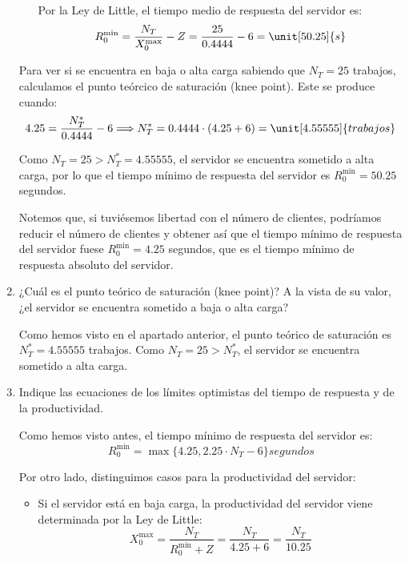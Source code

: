 \begin{ejercicio}
\begin{enumerate}
\begin{itemize}
            Por la Ley de Little, el tiempo medio de respuesta del servidor es:
            \begin{equation*}
                R_0^{\text{min}} = \dfrac{N_T}{X_0^{\text{max}}} - Z = \dfrac{25}{0.4444} - 6 = \unit[50.25]{s}
            \end{equation*}
        \end{itemize}

        Para ver si se encuentra en baja o alta carga sabiendo que $N_T=25$ trabajos, calculamos el punto teórcico de saturación (knee point). Este se produce cuando:
        \begin{equation*}
            4.25 = \dfrac{N_T^*}{0.4444} - 6
            \Longrightarrow N_T^* = 0.4444 \cdot (4.25 + 6) = \unit[4.55555]{trabajos}
        \end{equation*}

        Como $N_T = 25 > N_T^* = 4.55555$, el servidor se encuentra sometido a alta carga, por lo que el tiempo mínimo de respuesta del servidor es $R_0^{\text{min}} = 50.25$ segundos.
        \begin{observacion}
            Notemos que, si tuviésemos libertad con el número de clientes, podríamos reducir el número de clientes y obtener así que el tiempo mínimo de respuesta del servidor fuese $R_0^{\text{min}} = 4.25$ segundos, que es el tiempo mínimo de respuesta absoluto del servidor.
        \end{observacion}
        

        \item ¿Cuál es el punto teórico de saturación (knee point)? A la vista de su valor, ¿el servidor se encuentra sometido a baja o alta carga?
        
        Como hemos visto en el apartado anterior, el punto teórico de saturación es $N_T^* = 4.55555$ trabajos. Como $N_T = 25 > N_T^*$, el servidor se encuentra sometido a alta carga.
        \item Indique las ecuaciones de los límites optimistas del tiempo de respuesta y de la productividad.
        
        Como hemos visto antes, el tiempo mínimo de respuesta del servidor es:
        \begin{equation*}
            R_0^{\text{min}} = \max\{4.25, 2.25 \cdot N_T - 6\}\unit{segundos}
        \end{equation*}

        Por otro lado, distinguimos casos para la productividad del servidor:
        \begin{itemize}
            \item Si el servidor está en baja carga, la productividad del servidor viene determinada por la Ley de Little:
            \begin{equation*}
                X_0^{\text{max}} = \dfrac{N_T}{R_0^{\text{min}}+ Z} = \dfrac{N_T}{4.25 + 6} = \dfrac{N_T}{10.25}
            \end{equation*}


\end{itemize}
\end{enumerate}
\end{ejercicio}
